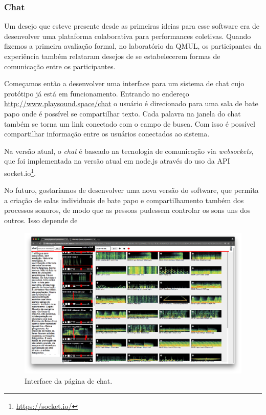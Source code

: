 \subsubsection{Chat}
Um desejo que esteve presente desde as primeiras ideias para esse software era de desenvolver uma plataforma colaborativa para performances coletivas. Quando fizemos a primeira avaliação formal, no laboratório da QMUL, os participantes da experiência também relataram desejos de se estabelecerem formas de comunicação entre os participantes.

Começamos então a desenvolver uma interface para um sistema de chat cujo protótipo já está em funcionamento. Entrando no endereço \url{http://www.playsound.space/chat} o usuário é direcionado para uma sala de bate papo onde é possível se compartilhar texto. Cada palavra na janela do chat também se torna um link conectado com o campo de busca. Com isso é possível compartilhar informação entre os usuários conectados ao sistema.

Na versão atual, o \emph{chat} é baseado na tecnologia de comunicação via \emph{websockets}, que foi implementada na versão atual em node.js através do uso da API socket.io\footnote{\url{https://socket.io/}}. 

No futuro, gostaríamos de desenvolver uma nova versão do software, que permita a criação de salas individuais de bate papo e compartilhamento também dos processos sonoros, de modo que as pessoas pudessem controlar os sons uns dos outros. Isso depende de 

\begin{figure}
\includegraphics[width=1\textwidth]{pictures/cap4/playsound-chat}
\caption{\label{handbell}Interface da página de chat.}
\label{fig:pschat}
\end{figure}



